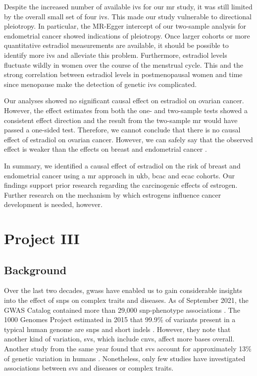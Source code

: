 \documentclass[draft]{scrbook}
\begin{document}
Despite the increased number of available \glspl{iv} for our \gls{mr} study, it was still limited by the overall small set of four \glspl{iv}.
This made our study vulnerable to directional pleiotropy.
In particular, the MR-Egger intercept of our two-sample analysis for endometrial cancer showed indications of pleiotropy.
Once larger cohorts or more quantitative estradiol measurements are available, it should be possible to identify more \glspl{iv} and alleviate this problem.
Furthermore, estradiol levels fluctuate wildly in women over the course of the menstrual cycle.
This and the strong correlation between estradiol levels in postmenopausal women and time since menopause make the detection of genetic \glspl{iv} complicated.

Our analyses showed no significant causal effect on estradiol on ovarian cancer.
However, the effect estimates from both the one- and two-sample tests showed a consistent effect direction and the result from the two-sample \gls{mr} would have passed a one-sided test.
Therefore, we cannot conclude that there is no causal effect of estradiol on ovarian cancer.
However, we can safely say that the observed effect is weaker than the effects on breast and endometrial cancer \cite{Trabert2016,Key2011,Rodriguez2019}.

In summary, we identified a causal effect of estradiol on the risk of breast and endometrial cancer using a \gls{mr} approach in \gls{ukb}, \gls{bcac} and \gls{ecac} cohorts.
Our findings support prior research regarding the carcinogenic effects of estrogen.
Further research on the mechanism by which estrogens influence cancer development is needed, however.

\chapter{Project III}
\section{Background}
Over the last two decades, \glspl{gwas} have enabled us to gain considerable insights into the effect of \glspl{snp} on complex traits and diseases.
As of September 2021, the GWAS Catalog contained more than 29,000 \gls{snp}-phenotype associations \cite{Buniello2019}.
The 1000 Genomes Project estimated in 2015 that 99.9\% of variants present in a typical human genome are \glspl{snp} and short indels \cite{Auton2015a}.
However, they note that another kind of variation, \glspl{sv}, which include \glspl{cnv}, affect more bases overall.
Another study from the same year found that  \glspl{sv} account for approximately 13\% of genetic variation in humans \cite{Sudmant2015}.
Nonetheless, only few studies have investigated associations between \glspl{sv} and diseases or complex traits.
\end{document}
